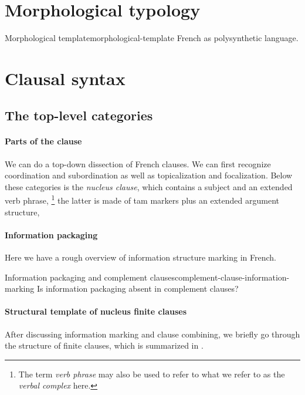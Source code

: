 \documentclass[a4paper, oneside, 12pt]{report}
\newcommand*{\term}[1]{\emph{#1}}
\begin{document}
\section{Morphological typology}

\begin{todobox}{Morphological template}{morphological-template}
    French as polysynthetic language.
\end{todobox}

\section{Clausal syntax}

\subsection{The top-level categories}

\paragraph*{Parts of the clause}
We can do a top-down dissection of French clauses.
We can first recognize coordination and subordination
as well as topicalization and focalization.
Below these categories is the \term{nucleus clause},
which contains a subject and an extended verb phrase,%
\footnote{
    The term \term{verb phrase} may also be used to refer to what we refer to as the \term{verbal complex} here.
}
the latter is made of \ac{tam} markers plus an extended argument structure,

\paragraph*{Information packaging}
Here we have a rough overview of information structure marking in French.

\begin{todobox}{Information packaging and complement clauses}{complement-clause-information-marking}
    Is information packaging absent in complement clauses?
\end{todobox}

\paragraph*{Structural template of nucleus finite clauses}
After discussing information marking and clause combining,
we briefly go through the structure of finite clauses,
which is summarized in .
\end{document}
